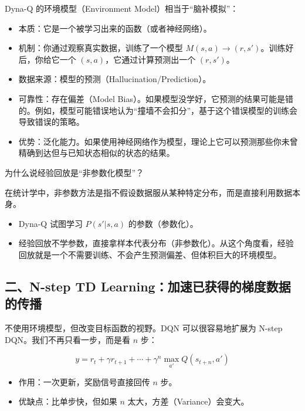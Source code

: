Dyna-Q 的环境模型（Environment Model）相当于``脑补模拟''：

\begin{itemize}
\tightlist
\item
  本质：它是一个被学习出来的函数（或者神经网络）。
\item
  机制：你通过观察真实数据，训练了一个模型 \(M(s,a)\to(r,s')\)。训练好后，你给它一个 \((s,a)\)，它通过计算预测出一个 \((r,s')\)。
\item
  数据来源：模型的预测（Hallucination/Prediction）。
\item
  可靠性：存在偏差（Model Bias）。如果模型没学好，它预测的结果可能是错的。例如，模型可能错误地认为``撞墙不会扣分''，基于这个错误模型的训练会导致错误的策略。
\item
  优势：泛化能力。如果使用神经网络作为模型，理论上它可以预测那些你未曾精确到达但与已知状态相似的状态的结果。
\end{itemize}

为什么说经验回放是``非参数化模型''？

在统计学中，非参数方法是指不假设数据服从某种特定分布，而是直接利用数据本身。

\begin{itemize}
\tightlist
\item
  Dyna-Q 试图学习 \(P(s'|s,a)\) 的参数（参数化）。
\item
  经验回放不学参数，直接拿样本代表分布（非参数化）。从这个角度看，经验回放就是一个不需要训练、不会产生预测偏差、但体积巨大的环境模型。
\end{itemize}

\hypertarget{ux4e8cn-step-td-learningux52a0ux901fux5df2ux83b7ux5f97ux7684ux68afux5ea6ux6570ux636eux7684ux4f20ux64ad}{%
\subsection{二、N-step TD Learning：加速已获得的梯度数据的传播}\label{ux4e8cn-step-td-learningux52a0ux901fux5df2ux83b7ux5f97ux7684ux68afux5ea6ux6570ux636eux7684ux4f20ux64ad}}

不使用环境模型，但改变目标函数的视野。DQN 可以很容易地扩展为 N-step DQN。我们不再只看一步，而是看 \(n\) 步：

\[
y=r_t+\gamma r_{t+1}+\cdots+\gamma^{n}\max_{a'}Q(s_{t+n},a')
\]

\begin{itemize}
\tightlist
\item
  作用：一次更新，奖励信号直接回传 \(n\) 步。
\item
  优缺点：比单步快，但如果 \(n\) 太大，方差（Variance）会变大。
\end{itemize}

